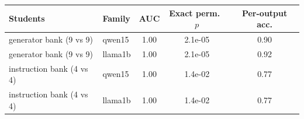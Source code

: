 \begin{tabular}{llccc}
\toprule
Students & Family & AUC & Exact perm.\ $p$ & Per-output acc.\\
\midrule
generator bank (9 vs 9) & qwen15 & 1.00 & 2.1e-05 & 0.90\\
generator bank (9 vs 9) & llama1b & 1.00 & 2.1e-05 & 0.92\\
instruction bank (4 vs 4) & qwen15 & 1.00 & 1.4e-02 & 0.77\\
instruction bank (4 vs 4) & llama1b & 1.00 & 1.4e-02 & 0.77\\
\bottomrule
\end{tabular}
